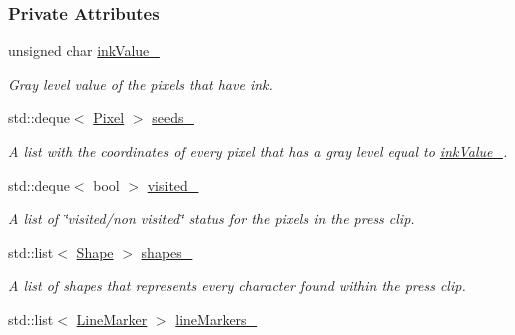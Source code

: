 \subsubsection*{Private Attributes}
\begin{CompactItemize}
\item 
\hypertarget{class_segmenter_fa6183f99aa6011399783652b341a43b}{
unsigned char \hyperlink{class_segmenter_fa6183f99aa6011399783652b341a43b}{inkValue\_\-}}
\label{class_segmenter_fa6183f99aa6011399783652b341a43b}

\begin{CompactList}\small\item\em Gray level value of the pixels that have ink. \item\end{CompactList}\item 
\hypertarget{class_segmenter_7859d050250b9fdf7c96374f80008d6e}{
std::deque$<$ \hyperlink{_pixel_8hpp_535e59456e3e633842529cfa8ea103c4}{Pixel} $>$ \hyperlink{class_segmenter_7859d050250b9fdf7c96374f80008d6e}{seeds\_\-}}
\label{class_segmenter_7859d050250b9fdf7c96374f80008d6e}

\begin{CompactList}\small\item\em A list with the coordinates of every pixel that has a gray level equal to \hyperlink{class_segmenter_fa6183f99aa6011399783652b341a43b}{inkValue\_\-}. \item\end{CompactList}\item 
\hypertarget{class_segmenter_fe4dd18749f268aae2b26a1abff6a607}{
std::deque$<$ bool $>$ \hyperlink{class_segmenter_fe4dd18749f268aae2b26a1abff6a607}{visited\_\-}}
\label{class_segmenter_fe4dd18749f268aae2b26a1abff6a607}

\begin{CompactList}\small\item\em A list of \char`\"{}visited/non visited\char`\"{} status for the pixels in the press clip. \item\end{CompactList}\item 
\hypertarget{class_segmenter_41b94ede2829063e0937dc150756e77e}{
std::list$<$ \hyperlink{class_shape}{Shape} $>$ \hyperlink{class_segmenter_41b94ede2829063e0937dc150756e77e}{shapes\_\-}}
\label{class_segmenter_41b94ede2829063e0937dc150756e77e}

\begin{CompactList}\small\item\em A list of shapes that represents every character found within the press clip. \item\end{CompactList}\item 
\hypertarget{class_segmenter_2789fd760ed7604765b3b147be454c09}{
std::list$<$ \hyperlink{_segmenter_8hpp_1d71cceafbb01dafa22c8672ecf80328}{LineMarker} $>$ \hyperlink{class_segmenter_2789fd760ed7604765b3b147be454c09}{lineMarkers\_\-}}
\label{class_segmenter_2789fd760ed7604765b3b147be454c09}


\end{CompactItemize}
